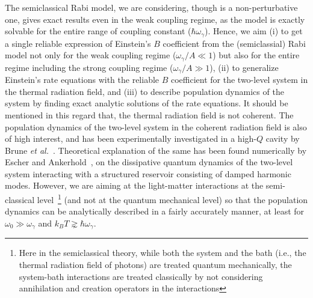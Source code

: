 \documentclass[aps,pra,twocolumn,showpacs,preprintnumbers,amsmath,amssymb,footinbib]{revtex4}
\begin{document}
The semiclassical Rabi model, we are considering, though is a non-perturbative one, gives exact results even in the weak coupling regime, as the model is exactly solvable for the entire range of coupling constant ($\hbar\omega_\gamma$). Hence, we aim (i) to get a single reliable expression of Einstein's $B$ coefficient from the (semiclassial) Rabi model not only for the weak coupling regime ($\omega_\gamma/A\ll1$) but also for the entire regime including the strong coupling regime ($\omega_\gamma/A\gg1$), (ii) to generalize Einstein's rate equations with the reliable $B$ coefficient for the two-level system in the thermal radiation field, and (iii) to describe population dynamics of the system by finding exact analytic solutions of the rate equations. It should be mentioned in this regard that, the thermal radiation field is not coherent. The population dynamics of the two-level system in the coherent radiation field is also of high interest, and has been experimentally investigated in a high-$Q$ cavity by Brune \textit{et al.}~\cite{Brune}. Theoretical explanation of the same has been found numerically by Escher and Ankerhold~\cite{Escher}, on the dissipative quantum dynamics of the two-level system interacting with a structured reservoir consisting of damped harmonic modes. However, we are aiming at the light-matter interactions at the semi-classical level~\footnote{Here in the semiclassical theory, while both the system and the bath (i.e., the thermal radiation field of photons) are treated quantum mechanically, the system-bath interactions are treated classically by not considering annihilation and creation operators in the interactions} (and not at the quantum mechanical level) so that the population dynamics can be analytically described in a fairly accurately manner, at least for $\omega_0\gg\omega_\gamma$ and $k_BT\gnsim \hbar\omega_\gamma$.
\end{document}
